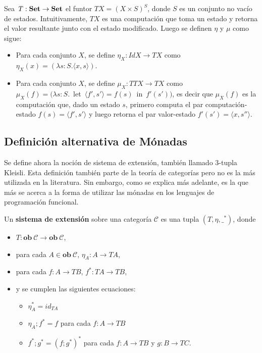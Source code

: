 \begin{ejemplo}
Sea $\mathit{T} : \text{\bf Set} \rightarrow \text{\bf Set}$ el funtor $\mathit{T} X = (X \times S)^S$, donde $S$ es un conjunto no vacío de estados. Intuitivamente, $\mathit{T} X$ es una computación que toma un estado y retorna el valor resultante junto con el estado modificado. Luego se definen $\eta$ y $\mu$ como sigue:
\begin{itemize}[noitemsep, label=$\blacktriangleright$]
	\item Para cada conjunto $X$, se define $\eta_X : \mathit{Id} X \rightarrow \mathit{T} X$ como $\eta_X (x) = (\lambda s : S . \langle x , s \rangle)$.
	\item Para cada conjunto $X$, se define $\mu_X : \mathit{T T} X \rightarrow \mathit{T} X$ como \\ \mbox{$\mu_X (f) = (\lambda s : S .$ let $\langle f' , s' \rangle = f(s)$ in $f'(s'))$}, es decir que $\mu_X (f)$ es la computación que, dado un estado $s$, primero computa el par computación-estado $f(s) = \langle f' , s' \rangle$ y luego retorna el par valor-estado $f'(s') = \langle x , s'' \rangle$.   
\end{itemize}
\end{ejemplo}

\subsection{Definición alternativa de Mónadas}\label{monadas:alt}

Se define ahora la noción de sistema de extensión, también llamado 3-tupla Kleisli. Esta definición también parte de la teoría de categorías pero no es la más utilizada en la literatura. Sin embargo, como se explica más adelante, es la que más se acerca a la forma de utilizar las mónadas en los lenguajes de programación funcional. 

\begin{definition}
Un \textbf{sistema de extensión} sobre una categoría $\mathscr{C}$ es una tupla $(\mathit{T},\eta,\_^*)$, donde 
\begin{itemize}[noitemsep,label=$\blacktriangleright$]
	\item $\mathit{T} : \mathbf{ob} \ \mathscr{C} \rightarrow \mathbf{ob} \ \mathscr{C}$,
	\item para cada $A \in \mathbf{ob} \ \mathscr{C}$, $\eta_A : A \rightarrow \mathit{T}A$,
	\item para cada $f : A \rightarrow \mathit{T}B$,  $f^* : \mathit{T}A \rightarrow \mathit{T}B$,
	\item y se cumplen las siguientes ecuaciones:
	\begin{itemize}[noitemsep,label=$\bullet$]
		\item $\eta^*_A = id_{\mathit{T}A}$
		\item $\eta_A ; f^* = f$ para cada $f : A \rightarrow \mathit{T}B$
		\item $f^* ; g^* = (f ; g^*)^*$ para cada $f : A \rightarrow \mathit{T}B$ y $g : B \rightarrow \mathit{T}C$.
	\end{itemize}
\end{itemize}
\end{definition}

